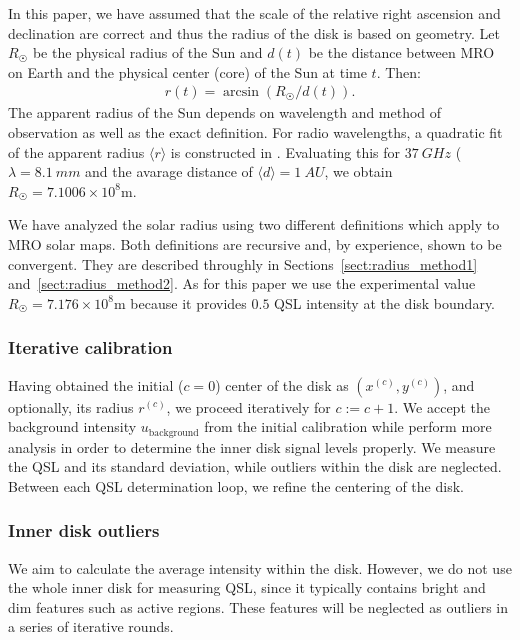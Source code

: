 \documentclass{aa}
\newcommand{\eqnl}[2]{\begin{eqnarray}\label{#1}#2\end{eqnarray}}
\newcommand{\ave}[1]{\langle #1 \rangle}
\newcommand{\s}[2]{{#1}_{\mathrm{#2}}}
\begin{document}
  In this paper, we have assumed that the scale of the relative right ascension and declination are correct and thus the 
  radius of the disk is based on geometry. Let $R_{\astrosun}$ be the physical radius of the Sun and $d(t)$ be the distance 
  between MRO on Earth and the physical center (core) of the Sun at time $t$. Then:
  \eqnl{visual_angle}{
  r(t) = \arcsin \left( R_{\astrosun} / d(t) \right) \text{.}
  }
  The apparent radius of the Sun depends on wavelength and method of observation as well as the exact definition. For radio wavelengths, a quadratic fit 
  of the apparent radius $\ave r$ is constructed in \cite{Rozelot15}. Evaluating this for $\SI{37}{GHz}$ ($\lambda = 
  \SI{8.1}{mm}$ and the avarage distance of $\ave d = \SI{1}{AU}$, we obtain $R_{\astrosun} = 7.1006 \times 10^8 
  \mathrm{m}$.

  We have analyzed the solar radius using two different definitions which apply to MRO solar maps. Both definitions are 
  recursive and, by experience, shown to be convergent. They are described throughly in 
  Sections~\ref{sect:radius_method1} and~\ref{sect:radius_method2}. As for this paper we use the experimental value 
  $R_{\astrosun} = 7.176 \times 10^8 \mathrm{m}$ because it provides $0.5$ QSL intensity at the disk boundary.

  \subsubsection{Iterative calibration} \label{sect:further_optimization}

  Having obtained the initial ($c=0$) center of the disk as $(x^{(c)}, y^{(c)})$, and optionally, its radius $r^{(c)}$, we 
  proceed iteratively for $c:=c+1$. We accept the background intensity $\s{u}{background}$ from the initial calibration while perform 
  more analysis in order to determine the inner disk signal levels properly. We measure the QSL and its standard 
  deviation, while outliers within the disk are neglected. Between each QSL determination loop, we refine the centering 
  of the disk.
  
  \subsubsection{Inner disk outliers} \label{sect:outliers_disk}

  We aim to calculate the average intensity within the disk. However, we do not use the whole inner disk for measuring 
  QSL, since it typically contains bright and dim features such as active regions. These features will be neglected as 
  outliers in a series of iterative rounds.
\end{document}
